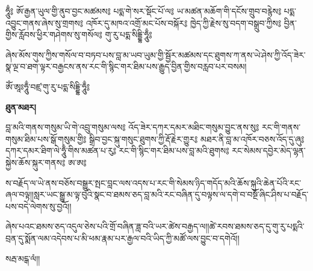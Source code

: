 \documentclass[duplex]{pecha}
\begin{document}
\begin{pecha}
ཧཱུྃ༔ ཨོ་རྒྱན་ཡུལ་གྱི་ནུབ་བྱང་མཚམས༔
པདྨ་གེ་སར་སྡོང་པོ་ལ༔
ཡ་མཚན་མཆོག་གི་དངོས་གྲུབ་བརྙེས༔
པདྨ་འབྱུང་གནས་ཞེས་སུ་གྲགས༔
འཁོར་དུ་མཁའ་འགྲོ་མང་པོས་བསྐོར༔
ཁྱེད་ཀྱི་རྗེས་སུ་བདག་བསྒྲུབ་ཀྱིས༔
བྱིན་གྱིས་རློབས་ཕྱིར་གཤེགས་སུ་གསོལ༔
གུ་རུ་པདྨ་སིདྡྷི་ཧཱུྃ༔

ཞེས་མོས་གུས་ཀྱིས་གསོལ་བ་བཏབ་པས་བླ་མ་ཡབ་ཡུམ་གྱི་སྦྱོར་མཚམས་དང་ཐུགས་ཀ་ནས་ཡེ་ཤེས་ཀྱི་འོད་ཟེར་སྣ་ལྔ་བ་ཐག་ལྟར་བརྒྱངས་ནས་རང་གི་སྙིང་གར་ཐིམ་པས་རྒྱུད་བྱིན་གྱིས་བརླབ་པར་བསམ།

ཨོཾ་ཨཱཿཧཱུྃ་བཛྲ་གུ་རུ་པདྨ་སིདྡྷི་ཧཱུྃ༔

{\small\bfseries ཐུན་མཐར།}

བླ་མའི་གནས་གསུམ་ཡི་གེ་འབྲུ་གསུམ་ལས༔
འོད་ཟེར་དཀར་དམར་མཐིང་གསུམ་བྱུང་ནས་སུ༔
རང་གི་གནས་གསུམ་ཐིམ་པས་སྒོ་གསུམ་གྱི༔
སྒྲིབ་བྱང་སྐུ་གསུང་ཐུགས་ཀྱི་རྡོ་རྗེར་གྱུར༔
མཐར་ནི་བླ་མ་འཁོར་བཅས་འོད་དུ་ཞུ༔
དཀར་དམར་ཐིག་ལེ་ཧཱུྃ་གིས་མཚན་པ་རུ༔
རང་གི་སྙིང་གར་ཐིམ་པས་བླ་མའི་ཐུགས༔
རང་སེམས་དབྱེར་མེད་ལྷན་སྐྱེས་ཆོས་སྐུར་གནས༔
ཨ་ཨ༔

ས་བརྗོད་ལ་ཡེ་ནས་བཅོས་བསྒྱུར་སྤང་བླང་ལས་འདས་པ་རང་གི་སེམས་ཉིད་གདོད་མའི་ཆོས་སྐུའི་ཆེན་པོའི་རང་ཞལ་བལྟ།།སླར་ཡང་སྒྱུ་མ་ལྟ་བུའི་སྣང་བ་ཐམས་ཅད་བླ་མའི་རང་བཞིན་དུ་བལྟས་ལ་དགེ་བ་བསྔོ་ཞིང་ཤིས་པ་བརྗོད་པས་བདེ་ལེགས་སུ་བྱའོ།།

ཞེས་པའང་ཐམས་ཅད་འདུལ་ཅེས་པའི་གྲོ་བཞིན་ཟླ་བའི་ཡར་ཚེས་བརྒྱད་ལ།།ཚེ་རབས་ཐམས་ཅད་དུ་གུ་རུ་པདྨའི་བྲན་དུ་སྨོན་ལམ་འདེབས་པ་མི་ཕམ་རྣམ་པར་རྒྱལ་བའི་ཡིད་ཀྱི་མཚོ་ལས་བྱུང་བ་དགེའོ།།

སརྦ་མངྒ་ལཾ།།

\end{pecha}
\end{document}
